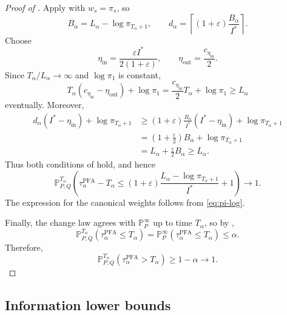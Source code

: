 \documentclass[12pt]{article}
\theoremstyle{spaced}
\theoremstyle{remark}
\newcommand{\eps}{\varepsilon}
\newcommand{\Pinf}[1]{\mathbb P_{#1}^{\infty}}
\begin{document}
\begin{proof}[Proof of ]
Apply  with $w_s=\pi_s$, so
\[
    B_\alpha=L_\alpha-\log\pi_{T_\alpha+1},
    \qquad
    d_\alpha=
    \left\lceil
        (1+\eps)\frac{B_\alpha}{I^*}
    \right\rceil.
\]
Choose
\[
    \eta_{\mathrm{in}}
    =\frac{\eps I^*}{2(1+\eps)},
    \qquad
    \eta_{\mathrm{out}}
    =\frac{c_{\eta_{\mathrm{in}}}}{2}.
\]
Since $T_\alpha/L_\alpha\to\infty$ and $\log\pi_1$ is constant,
\[
    T_\alpha
    (c_{\eta_{\mathrm{in}}}-\eta_{\mathrm{out}})
    +\log\pi_1
    =
    \frac{c_{\eta_{\mathrm{in}}}}{2}T_\alpha+\log\pi_1
    \ge L_\alpha
\]
eventually. Moreover,
\begin{align*}
    d_\alpha(I^*-\eta_{\mathrm{in}})
    +\log\pi_{T_\alpha+1}
    &\ge
    (1+\eps)\frac{B_\alpha}{I^*}
    (I^*-\eta_{\mathrm{in}})
    +\log\pi_{T_\alpha+1}\\
    &=
    \left(1+\frac{\eps}{2}\right)B_\alpha
    +\log\pi_{T_\alpha+1}\\
    &=
    L_\alpha+\frac{\eps}{2}B_\alpha
    \ge L_\alpha.
\end{align*}
Thus both conditions of  hold, and hence
\[
    \mathbb P_{P,Q}^{T_\alpha}
    \left(
        \tau_\alpha^{\mathrm{PFA}}-T_\alpha
        \le
        (1+\eps)
        \frac{L_\alpha-\log\pi_{T_\alpha+1}}{I^*}
        +1
    \right)
    \to1.
\]
The expression for the canonical weights follows from
\eqref{eq:pi-log}.

Finally, the change law agrees with $\Pinf{P}$ up to time
$T_\alpha$, so by ,
\[
    \mathbb P_{P,Q}^{T_\alpha}
    (\tau_\alpha^{\mathrm{PFA}}\le T_\alpha)
    =
    \Pinf{P}(\tau_\alpha^{\mathrm{PFA}}\le T_\alpha)
    \le \alpha.
\]
Therefore,
\[
    \mathbb P_{P,Q}^{T_\alpha}
    (\tau_\alpha^{\mathrm{PFA}}>T_\alpha)
    \ge 1-\alpha\to1.
\]
\end{proof}

\subsection{Information lower bounds}\label{app:proof-lower-bounds}
\end{document}
